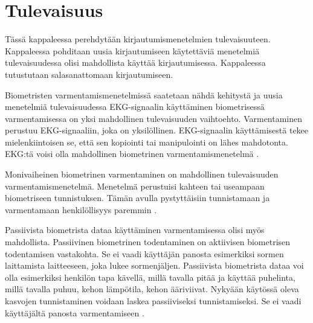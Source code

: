 \chapter{Tulevaisuus\label{tulevaisuus}}

Tässä kappaleessa perehdytään kirjautumismenetelmien tulevaisuuteen. Kappaleessa pohditaan uusia kirjautumiseen käytettäviä menetelmiä tulevaisuudessa olisi mahdollista käyttää kirjautumisessa. Kappaleessa tutustutaan salasanattomaan kirjautumiseen.

Biometristen varmentamismenetelmissä saatetaan nähdä kehitystä ja uusia menetelmiä tulevaisuudessa EKG-signaalin käyttäminen biometrisessä varmentamisessa on yksi mahdollinen tulevaisuuden vaihtoehto. Varmentaminen perustuu EKG-signaaliin, joka on yksilöllinen. EKG-signaalin käyttämisestä tekee mielenkiintoisen se, että sen kopiointi tai manipulointi on lähes mahdotonta. EKG:tä voisi olla mahdollinen biometrinen varmentamismenetelmä \citep{shdefat2018utilizing}.

Monivaiheinen biometrinen varmentaminen on mahdollinen tulevaisuuden varmentamismenetelmä. Menetelmä perustuisi kahteen tai useampaan biometriseen tunnistuksen. Tämän avulla pystyttäisiin tunnistamaan ja varmentamaan henkilöllisyys paremmin \citep{biometric_authentication_systems}.

Passiivista biometrista dataa käyttäminen varmentamisessa olisi myös mahdollista. Passiivinen biometrinen todentaminen on aktiivisen biometrisen todentamisen vastakohta. Se ei vaadi käyttäjän panosta esimerkiksi sormen laittamista laitteeseen, joka lukee sormenjäljen. Passiivista biometrista dataa voi olla esimerkiksi henkilön tapa kävellä, millä tavalla pitää ja käyttää puhelinta, millä tavalla puhuu, kehon lämpötila, kehon ääriviivat. Nykyään käytössä oleva kasvojen tunnistaminen voidaan laskea passiiviseksi tunnistamiseksi. Se ei vaadi käyttäjältä panosta varmentamiseen \citep{biometric_authentication_systems} \citep{passive_biometrics}.

